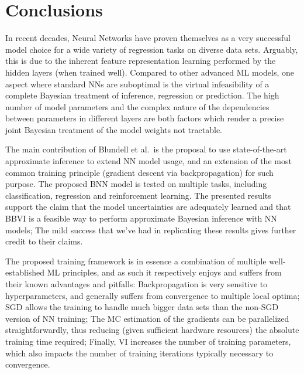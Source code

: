 \documentclass[11pt]{article}
\begin{document}
\section{Conclusions}

In recent decades, Neural Networks have proven themselves as a very successful
model choice for a wide variety of regression tasks on diverse data sets.
Arguably, this is due to the inherent feature representation learning performed
by the hidden layers (when trained well).  Compared to other advanced ML models,
one aspect where standard NNs are suboptimal is the virtual infeasibility of
a complete Bayesian treatment of inference, regression or prediction.  The high
number of model parameters and the complex nature of the dependencies between
parameters in different layers are both factors which render a precise joint
Bayesian treatment of the model weights not tractable.

The main contribution of Blundell et al.\ is the proposal to use
state-of-the-art approximate inference to extend NN model usage, and an
extension of the most common training principle (gradient descent via
backpropagation) for such purpose.  The proposed BNN model is tested on
multiple tasks, including classification, regression and reinforcement
learning.  The presented results support the claim that the model uncertainties
are adequately learned and that BBVI is a feasible way to perform approximate
Bayesian inference with NN models; The mild success that we've had in
replicating these results gives further credit to their claims.

The proposed training framework is in essence a combination of multiple
well-established ML principles, and as such it respectively enjoys and suffers
from their known advantages and pitfalls: Backpropagation is very sensitive to
hyperparameters, and generally suffers from convergence to multiple local
optima; SGD allows the training to handle much bigger data sets than the
non-SGD version of NN training; The MC estimation of the gradients can be
parallelized straightforwardly, thus reducing (given sufficient hardware
resources) the absolute training time required; Finally, VI increases the
number of training parameters, which also impacts the number of training
iterations typically necessary to convergence.



 
\end{document}

